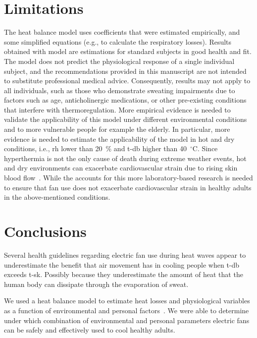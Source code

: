 \section*{Limitations}
The  heat balance model uses coefficients that were estimated empirically, and some simplified equations (e.g., to calculate the respiratory losses).
Results obtained with  model are estimations for standard subjects in good health and fit.
The model does not predict the physiological response of a single individual subject, and the recommendations provided in this manuscript are not intended to substitute professional medical advice.
Consequently, results may not apply to all individuals, such as those who demonstrate sweating impairments due to factors such as age, anticholinergic medications, or other pre-existing conditions that interfere with thermoregulation.
More empirical evidence is needed to validate the applicability of this model under different environmental conditions and to more vulnerable people for example the elderly.
In particular, more evidence is needed to estimate the applicability of the  model in hot and dry conditions, i.e., \ac{rh} lower than 20~\% and \ac{t-db} higher than 40~$^{\circ}$C.\@
Since hyperthermia is not the only cause of death during extreme weather events, hot and dry environments can exacerbate cardiovascular strain due to rising skin blood flow~\cite{Morris2021a}.
While the  accounts for this more laboratory-based research is needed to ensure that fan use does not exacerbate cardiovascular strain in healthy adults in the above-mentioned conditions.

\section{Conclusions}\label{sec:conclusions}
Several health guidelines regarding electric fan use during heat waves appear to underestimate the benefit that air movement has in cooling people when \acf{t-db} exceeds \acf{t-sk}.
Possibly because they underestimate the amount of heat that the human body can dissipate through the evaporation of sweat.

We used a heat balance model to estimate heat losses and physiological variables as a function of environmental and personal factors~\cite{Gagge1986}.
We were able to determine under which combination of environmental and personal parameters electric fans can be safely and effectively used to cool healthy adults.

